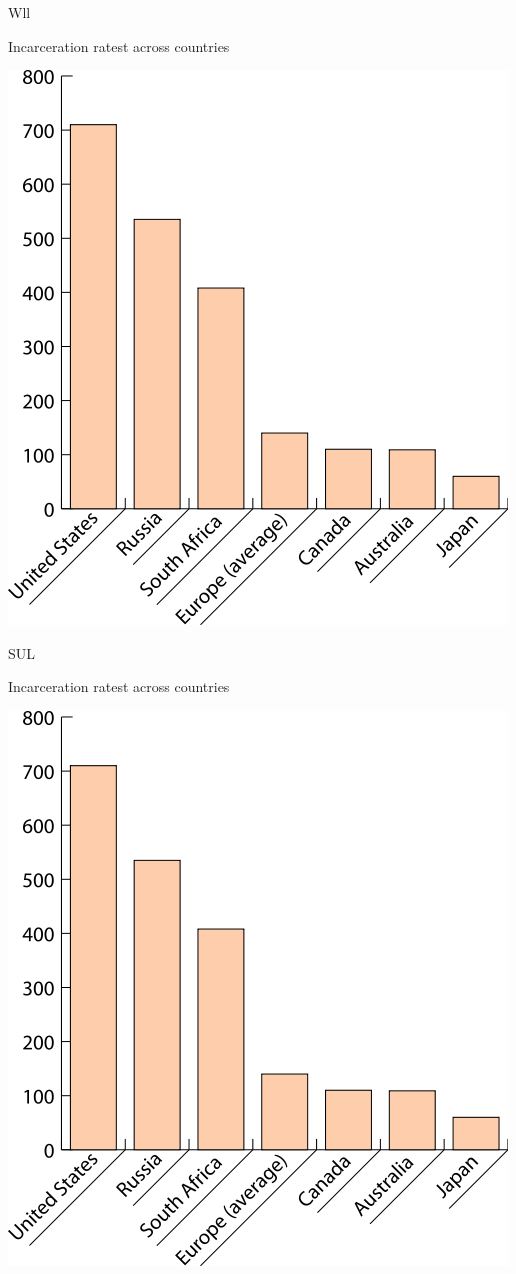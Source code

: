 \begin{map}{W}{ll}
\caption{Incarceration ratest across countries}
\label{chart:incarceration}
\includegraphics[width=\chartwidth,height=\chartheight]{incarceration}  
\end{map}

\lipsum[1-2]

\begin{chart}{S}{UL}
\caption{Incarceration ratest across countries}
\label{chart:incarceration}
\includegraphics[width=\chartwidth,height=\chartheight]{incarceration}  
\end{chart}

